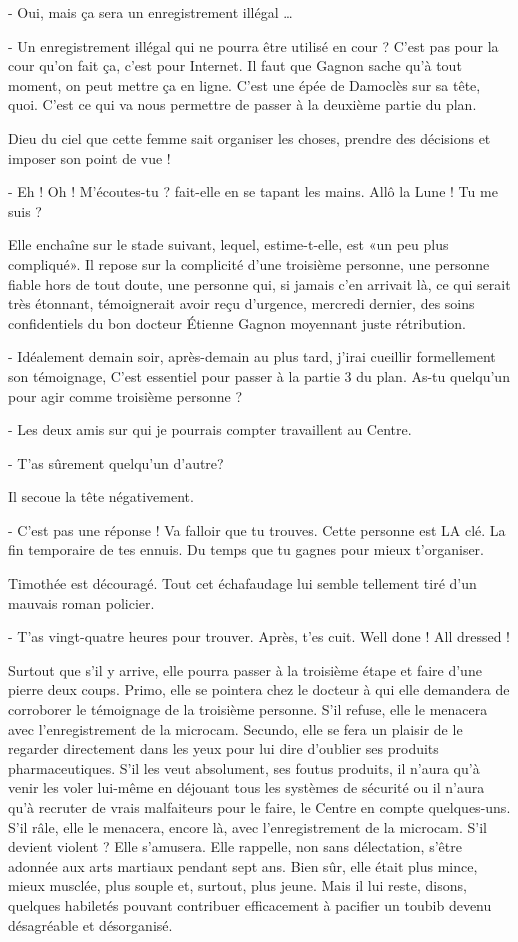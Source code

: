 - Oui, mais ça sera un enregistrement illégal …

- Un enregistrement illégal qui ne pourra être utilisé en cour ? C’est pas pour la cour qu’on fait ça, c’est pour Internet. Il faut que Gagnon sache qu’à tout moment, on peut mettre ça en ligne. C’est une épée de Damoclès sur sa tête, quoi. C’est ce qui va nous permettre de passer à la deuxième partie du plan.

Dieu du ciel que cette femme sait organiser les choses, prendre des décisions et imposer son point de vue !

- Eh ! Oh ! M’écoutes-tu ? fait-elle en se tapant les mains. Allô la Lune ! Tu me suis ?

Elle enchaîne sur le stade suivant, lequel, estime-t-elle, est «un peu plus compliqué». Il repose sur la complicité d’une troisième personne, une personne fiable hors de tout doute, une personne qui, si jamais c’en arrivait là, ce qui serait très étonnant, témoignerait avoir reçu d’urgence, mercredi dernier, des soins confidentiels du bon docteur Étienne Gagnon moyennant juste rétribution.

- Idéalement demain soir, après-demain au plus tard, j’irai cueillir formellement son témoignage, C’est essentiel pour passer à la partie 3 du plan. As-tu quelqu’un pour agir comme troisième personne ?

- Les deux amis sur qui je pourrais compter travaillent au Centre.

- T’as sûrement quelqu’un d’autre?

Il secoue la tête négativement.

- C’est pas une réponse ! Va falloir que tu trouves. Cette personne est LA clé. La fin temporaire de tes ennuis. Du temps que tu gagnes pour mieux t’organiser.

Timothée est découragé. Tout cet échafaudage lui semble tellement tiré d’un mauvais roman policier.

- T’as vingt-quatre heures pour trouver. Après, t’es cuit. Well done ! All dressed !

Surtout que s’il y arrive, elle pourra passer à la troisième étape et faire d’une pierre deux coups. Primo, elle se pointera chez le docteur à qui elle demandera de corroborer le témoignage de la troisième personne. S’il refuse, elle le menacera avec l’enregistrement de la microcam. Secundo, elle se fera un plaisir de le regarder directement dans les yeux pour lui dire d’oublier ses produits pharmaceutiques. S’il les veut absolument, ses foutus produits, il n’aura qu’à venir les voler lui-même en déjouant tous les systèmes de sécurité ou il n’aura qu’à recruter de vrais malfaiteurs pour le faire, le Centre en compte quelques-uns. S’il râle, elle le menacera, encore là, avec l’enregistrement de la microcam. S’il devient violent ? Elle s’amusera. Elle rappelle, non sans délectation, s’être adonnée aux arts martiaux pendant sept ans. Bien sûr, elle était plus mince, mieux musclée, plus souple et, surtout, plus jeune. Mais il lui reste, disons, quelques habiletés pouvant contribuer efficacement à pacifier un toubib devenu désagréable et désorganisé.


